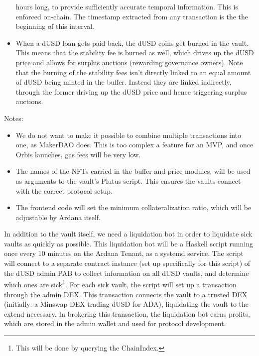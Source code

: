 \documentclass{article} %
\begin{document}
\begin{itemize}
    hours long, to provide sufficiently accurate temporal information. This is
    enforced on-chain. The timestamp extracted from any transaction is the the
    beginning of this interval.
  \item When a dUSD loan gets paid back, the dUSD coins get burned in the vault.
    This means that the stability fee is burned as well, which drives up the
    dUSD price and allows for surplus auctions (rewarding governance owners).
    Note that the burning of the stability fees isn't directly linked to an
    equal amount of dUSD being minted in the buffer.
    Instead they are linked indirectly, through the former driving up the dUSD
    price and hence triggering surplus auctions.
\end{itemize}

Notes:
\begin{itemize}
  \item We do not want to make it possible to combine multiple transactions into
    one, as MakerDAO does.
    This is too complex a feature for an MVP, and once Orbis launches, gas fees
    will be very low.
  \item The names of the NFTs carried in the buffer and price modules, will be
    used as arguments to the vault's Plutus script.
    This ensures the vaults connect with the correct protocol setup.
  \item The frontend code will set the minimum collateralization ratio, which
    will be adjustable by Ardana itself.
\end{itemize}

In addition to the vault itself, we need a liquidation bot in order to liquidate
sick vaults as quickly as possible.
This liquidation bot will be a Haskell script running once every $10$ minutes on
the Ardana Tenant, as a systemd service.
The script will connect to a separate contract instance (set up specifically for
this script) of the dUSD admin PAB to collect information on all dUSD vaults,
and determine which ones are sick\footnote{
  This will be done by querying the ChainIndex.
}.
For each sick vault, the script will set up a transaction through the admin DEX.
This transaction connects the vault to a trusted DEX (initially: a Minswap DEX
trading dUSD for ADA), liquidating the vault to the extend necessary.
In brokering this transaction, the liquidation bot earns profits, which are
stored in the admin wallet and used for protocol development.
\end{document}
